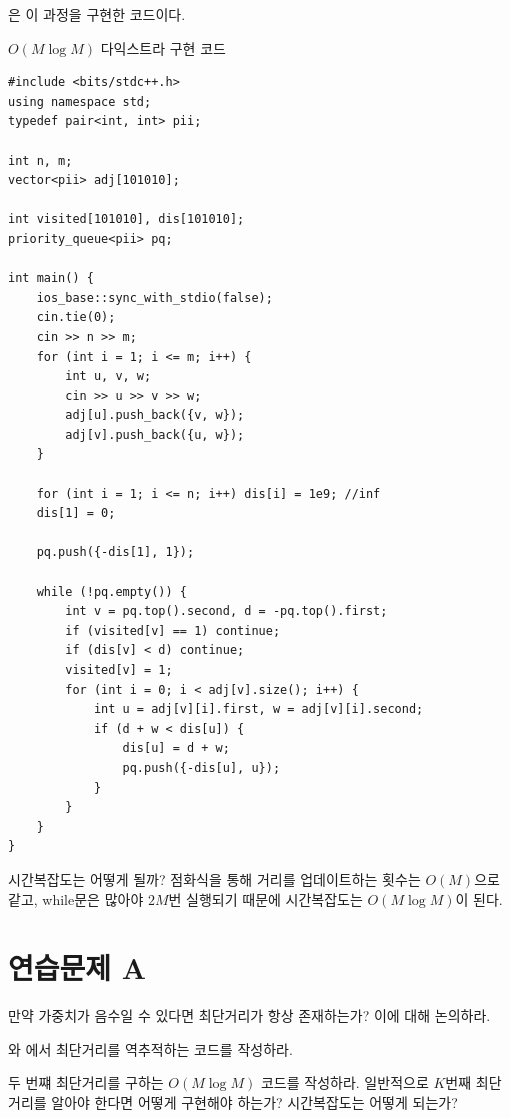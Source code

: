 은 이 과정을 구현한 코드이다.
\begin{code} \label{code: Dijkstra-heap}
$O(M \log M)$ 다익스트라 구현 코드
\begin{lstlisting}
#include <bits/stdc++.h>
using namespace std;
typedef pair<int, int> pii;

int n, m;
vector<pii> adj[101010];

int visited[101010], dis[101010];
priority_queue<pii> pq;

int main() {
    ios_base::sync_with_stdio(false);
    cin.tie(0);
    cin >> n >> m;
    for (int i = 1; i <= m; i++) {
        int u, v, w;
        cin >> u >> v >> w;
        adj[u].push_back({v, w});
        adj[v].push_back({u, w});
    }
    
    for (int i = 1; i <= n; i++) dis[i] = 1e9; //inf
    dis[1] = 0;

    pq.push({-dis[1], 1});
    
    while (!pq.empty()) {
        int v = pq.top().second, d = -pq.top().first;
        if (visited[v] == 1) continue;
        if (dis[v] < d) continue;
        visited[v] = 1;
        for (int i = 0; i < adj[v].size(); i++) {
            int u = adj[v][i].first, w = adj[v][i].second;
            if (d + w < dis[u]) {
                dis[u] = d + w;
                pq.push({-dis[u], u});
            }
        }
    }
}
\end{lstlisting}
\end{code}

시간복잡도는 어떻게 될까? 점화식을 통해 거리를 업데이트하는 횟수는 $O(M)$으로 같고, while문은 많아야 $2M$번 실행되기 때문에 시간복잡도는 $O(M \log M)$이 된다.

\section{연습문제 A}
\begin{problem}
    만약 가중치가 음수일 수 있다면 최단거리가 항상 존재하는가? 이에 대해 논의하라.
\end{problem}
\begin{problem}
    와 에서 최단거리를 역추적하는 코드를 작성하라.
\end{problem}
\begin{problem}
    두 번쨰 최단거리를 구하는 $O(M \log M)$ 코드를 작성하라. 일반적으로 $K$번째 최단거리를 알아야 한다면 어떻게 구현해야 하는가? 시간복잡도는 어떻게 되는가?
\end{problem}


